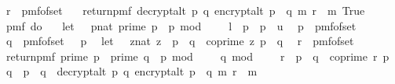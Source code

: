 \begin{isabellebody}
\ \ r\ {\isasymleftarrow}\ pmf{\isacharunderscore}{\kern0pt}of{\isacharunderscore}{\kern0pt}set\ {\isasymZ}{\isacharsemicolon}{\kern0pt}\isanewline
\ \ return{\isacharunderscore}{\kern0pt}pmf\ {\isacharparenleft}{\kern0pt}decrypt{\isacharunderscore}{\kern0pt}alt\ p\ q\ {\isacharparenleft}{\kern0pt}encrypt{\isacharunderscore}{\kern0pt}alt\ {\isacharparenleft}{\kern0pt}p\ {\isacharasterisk}{\kern0pt}\ q{\isacharparenright}{\kern0pt}\ m\ r{\isacharparenright}{\kern0pt}\ {\isacharequal}{\kern0pt}\ m{\isacharparenright}{\kern0pt}{\isacharbraceright}{\kern0pt}{\isacharparenright}{\kern0pt}\ True\isanewline
\ \ {\isacharequal}{\kern0pt}\ \isanewline
\ \ pmf\ {\isacharparenleft}{\kern0pt}do\ {\isacharbraceleft}{\kern0pt}\isanewline
\ \ let\ {\isasymK}\ {\isacharequal}{\kern0pt}\ {\isacharbraceleft}{\kern0pt}{\isacharparenleft}{\kern0pt}p{\isacharcolon}{\kern0pt}{\isacharcolon}{\kern0pt}nat{\isacharparenright}{\kern0pt}{\isachardot}{\kern0pt}\ prime\ p\ {\isasymand}\ p\ mod\ {}\ {\isacharequal}{\kern0pt}\ {}\ {\isasymand}\ l\ {\isasymle}\ p\ {\isasymand}\ p\ {\isasymle}\ u{\isacharbraceright}{\kern0pt}{\isacharsemicolon}{\kern0pt}\isanewline
\ \ p\ {\isasymleftarrow}\ pmf{\isacharunderscore}{\kern0pt}of{\isacharunderscore}{\kern0pt}set\ {\isasymK}{\isacharsemicolon}{\kern0pt}\ \isanewline
\ \ q\ {\isasymleftarrow}\ pmf{\isacharunderscore}{\kern0pt}of{\isacharunderscore}{\kern0pt}set\ {\isacharparenleft}{\kern0pt}{\isasymK}\ {\isacharminus}{\kern0pt}\ {\isacharbraceleft}{\kern0pt}p{\isacharbraceright}{\kern0pt}{\isacharparenright}{\kern0pt}{\isacharsemicolon}{\kern0pt}\isanewline
\ \ let\ {\isasymZ}\ {\isacharequal}{\kern0pt}\ {\isacharbraceleft}{\kern0pt}{\isacharparenleft}{\kern0pt}z{\isacharcolon}{\kern0pt}{\isacharcolon}{\kern0pt}nat{\isacharparenright}{\kern0pt}{\isachardot}{\kern0pt}\ z\ {\isacharless}{\kern0pt}\ p\ {\isacharasterisk}{\kern0pt}\ q\ {\isasymand}\ coprime\ z\ {\isacharparenleft}{\kern0pt}p\ {\isacharasterisk}{\kern0pt}\ q{\isacharparenright}{\kern0pt}{\isacharbraceright}{\kern0pt}{\isacharsemicolon}{\kern0pt}\isanewline
\ \ r\ {\isasymleftarrow}\ pmf{\isacharunderscore}{\kern0pt}of{\isacharunderscore}{\kern0pt}set\ {\isasymZ}{\isacharsemicolon}{\kern0pt}\isanewline
\ \ return{\isacharunderscore}{\kern0pt}pmf\ {\isacharparenleft}{\kern0pt}{\isacharparenleft}{\kern0pt}prime\ p\ {\isasymand}\ prime\ q\ {\isasymand}\ p\ mod\ {}\ {\isacharequal}{\kern0pt}\ {}\ {\isasymand}\ q\ mod\ {}\ {\isacharequal}{\kern0pt}\ {}\ {\isasymand}\ r\ {\isacharless}{\kern0pt}\ p\ {\isacharasterisk}{\kern0pt}\ q\ {\isasymand}\ coprime\ r\ {\isacharparenleft}{\kern0pt}p\ {\isacharasterisk}{\kern0pt}\ q{\isacharparenright}{\kern0pt}\ {\isasymand}\ p\ {\isasymnoteq}\ q{\isacharparenright}{\kern0pt}\ {\isasymor}\ decrypt{\isacharunderscore}{\kern0pt}alt\ p\ q\ {\isacharparenleft}{\kern0pt}encrypt{\isacharunderscore}{\kern0pt}alt\ {\isacharparenleft}{\kern0pt}p\ {\isacharasterisk}{\kern0pt}\ q{\isacharparenright}{\kern0pt}\ m\ r{\isacharparenright}{\kern0pt}\ {\isacharequal}{\kern0pt}\ m{\isacharparenright}{\kern0pt}{\isacharbraceright}{\kern0pt}{\isacharparenright}{\kern0pt}\ \isanewline

\end{isabellebody}
